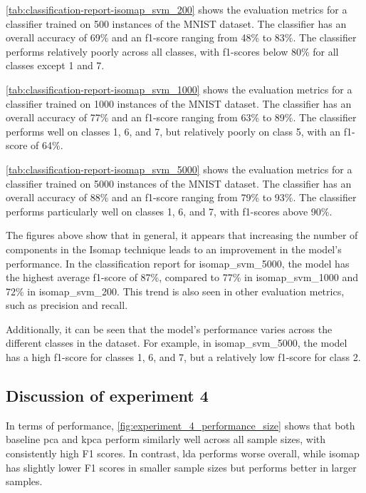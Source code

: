 

\autoref{tab:classification-report-isomap_svm_200} shows the evaluation metrics for a classifier trained on 500 instances of the MNIST dataset. The classifier has an overall accuracy of 69\% and an f1-score ranging from 48\% to 83\%. The classifier performs relatively poorly across all classes, with f1-scores below 80\% for all classes except 1 and 7.



\autoref{tab:classification-report-isomap_svm_1000} shows the evaluation metrics for a classifier trained on 1000 instances of the MNIST dataset. The classifier has an overall accuracy of 77\% and an f1-score ranging from 63\% to 89\%. The classifier performs well on classes 1, 6, and 7, but relatively poorly on class 5, with an f1-score of 64\%.





\autoref{tab:classification-report-isomap_svm_5000} shows the evaluation metrics for a classifier trained on 5000 instances of the MNIST dataset. The classifier has an overall accuracy of 88\% and an f1-score ranging from 79\% to 93\%. The classifier performs particularly well on classes 1, 6, and 7, with f1-scores above 90\%.


The figures above show that in general, it appears that increasing the number of components in the Isomap technique leads to an improvement in the model's performance. In the classification report for isomap\_svm\_5000, the model has the highest average f1-score of 87\%, compared to 77\% in isomap\_svm\_1000 and 72\% in isomap\_svm\_200. This trend is also seen in other evaluation metrics, such as precision and recall.

Additionally, it can be  seen that the model's performance varies across the different classes in the dataset. For example, in isomap\_svm\_5000, the model has a high f1-score for classes 1, 6, and 7, but a relatively low f1-score for class 2.


\subsection{Discussion of experiment 4}
In terms of performance, \autoref{fig:experiment_4_performance_size} shows that both baseline \gls{pca} and \gls{kpca} perform similarly well across all sample sizes, with consistently high F1 scores. In contrast, \gls{lda} performs worse overall, while \gls{isomap} has slightly lower F1 scores in smaller sample sizes but performs better in larger samples.


